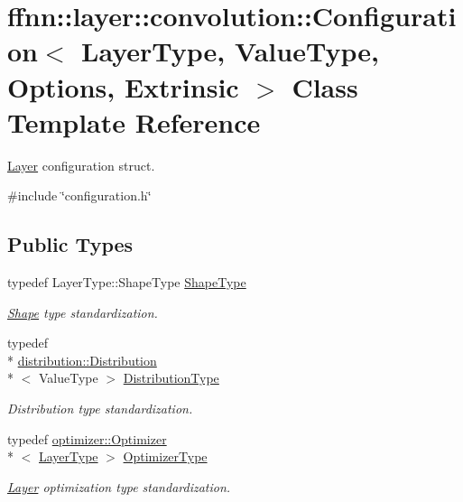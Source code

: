 \hypertarget{classffnn_1_1layer_1_1convolution_1_1_configuration}{\section{ffnn\-:\-:layer\-:\-:convolution\-:\-:Configuration$<$ Layer\-Type, Value\-Type, Options, Extrinsic $>$ Class Template Reference}
\label{classffnn_1_1layer_1_1convolution_1_1_configuration}
}


\hyperlink{classffnn_1_1layer_1_1_layer}{Layer} configuration struct.  




{\ttfamily \#include \char`\"{}configuration.\-h\char`\"{}}

\subsection*{Public Types}
\begin{DoxyCompactItemize}
\item 
typedef Layer\-Type\-::\-Shape\-Type \hyperlink{classffnn_1_1layer_1_1convolution_1_1_configuration_a4bb0b2d358739ef69e845994050602e1}{Shape\-Type}
\begin{DoxyCompactList}\small\item\em \hyperlink{structffnn_1_1layer_1_1_shape}{Shape} type standardization. \end{DoxyCompactList}\item 
typedef \\*
\hyperlink{classffnn_1_1distribution_1_1_distribution}{distribution\-::\-Distribution}\\*
$<$ Value\-Type $>$ \hyperlink{classffnn_1_1layer_1_1convolution_1_1_configuration_ac34e983386fa6c4af4311cf95371444b}{Distribution\-Type}
\begin{DoxyCompactList}\small\item\em Distribution type standardization. \end{DoxyCompactList}\item 
typedef \hyperlink{classffnn_1_1optimizer_1_1_optimizer}{optimizer\-::\-Optimizer}\\*
$<$ \hyperlink{classffnn_1_1layer_1_1convolution_1_1_configuration_a12e530507865f85db9b75c2d78493442}{Layer\-Type} $>$ \hyperlink{classffnn_1_1layer_1_1convolution_1_1_configuration_af8f1c1e1c842a15756475259dcdd6bd4}{Optimizer\-Type}
\begin{DoxyCompactList}\small\item\em \hyperlink{classffnn_1_1layer_1_1_layer}{Layer} optimization type standardization. \end{DoxyCompactList}\end{DoxyCompactItemize}
